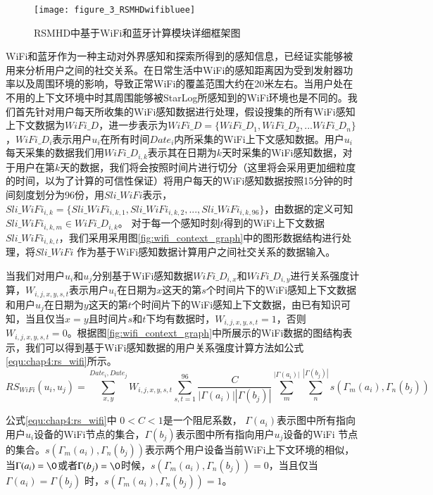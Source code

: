 \begin{figure}[htp]
\centering
\texttt{[image: figure\_3\_RSMHDwifibluee]}
\caption{RSMHD中基于WiFi和蓝牙计算模块详细框架图}
\label{fig:7_1_wifi}
\end{figure}
\par WiFi和蓝牙作为一种主动对外界感知和探索所得到的感知信息，已经证实能够被用来分析用户之间的社交关系。在日常生活中WiFi的感知距离因为受到发射器功率以及周围环境的影响，导致正常WiFi的覆盖范围大约在20米左右。当用户处在不用的上下文环境中时其周围能够被StarLog所感知到的WiFi环境也是不同的。我们首先针对用户每天所收集的WiFi感知数据进行处理，假设搜集的所有WiFi感知上下文数据为$WiFi\_D$，进一步表示为$WiFi\_D=\{  WiFi\_D_{1},WiFi\_D_{2},...WiFi\_D_{n}  \}$，$WiFi\_D_{i}$表示用户$u_{i}$在所有时间$Date_{i}$内所采集的WiFi上下文感知数据。用户$u_{i}$每天采集的数据我们用$WiFi\_D_{i,k}$表示其在日期为$k$天时采集的WiFi感知数据，对于用户在第$k$天的数据，我们将会按照时间片进行切分（这里将会采用更加细粒度的时间，以为了计算的可信性保证）将用户每天的WiFi感知数据按照15分钟的时间刻度划分为96份，用$Sli\_WiFi$表示，$Sli\_WiFi_{i,k}=\{Sli\_WiFi_{i,k,1},Sli\_WiFi_{i,k,2},...,Sli\_WiFi_{i,k,96}\}$，由数据的定义可知$Sli\_WiFi_{i,k,m} \in WiFi\_D_{i,k}$。 对于每一个感知时刻$t$得到的WiFi上下文数据$Sli\_WiFi_{i,k,t}$，我们采用采用图\ref{fig:wifi_context_graph}中的图形数据结构进行处理，将$Sli\_WiFi$ 作为基于WiFi感知数据计算用户之间社交关系的数据输入。

\par 当我们对用户$u_{i}$和$u_{j}$分别基于WiFi感知数据$WiFi\_D_{i,x}$和$WiFi\_D_{i,y}$进行关系强度计算，$W_{i,j,x,y,s,t}$表示用户$u_{i}$在日期为$x$这天的第$s$个时间片下的WiFi感知上下文数据和用户$u_{j}$在日期为$y$这天的第$t$个时间片下的WiFi感知上下文数据，由已有知识可知，当且仅当$x=y$且时间片$s$和$t$下均有数据时，$W_{i,j,x,y,s,t}=1$，否则$W_{i,j,x,y,s,t}=0$。根据图\ref{fig:wifi_context_graph}中所展示的WiFi数据的图结构表示，我们可以得到基于WiFi感知数据的用户关系强度计算方法如公式\ref{equ:chap4:rs_wifi}所示。
\begin{equation}
\label{equ:chap4:rs_wifi}
RS_{WiFi}(u_{i},u_{j})=\sum_{x ,y }^{ Date_{i}, Date_{j}}W_{i,j,x,y,s,t}\sum_{s,t=1}^{96} \frac{C}{ \left |\Gamma (a_{i})  \right |\left |\Gamma (b_{j})  \right | } \sum_{m}^{\left |\Gamma (a_{i})  \right |}  \sum_{n}^{\left |\Gamma (b_{j})  \right |}s(\Gamma_{m} (a_{i}),\Gamma_{n} (b_{j}))
\end{equation}
\par 公式\ref{equ:chap4:rs_wifi}中  $0< C<1$是一个阻尼系数， $\Gamma (a_{i}) $表示图中所有指向用户$u_{i}$设备的WiFi节点的集合，$\Gamma (b_{j}) $表示图中所有指向用户$u_{j}$设备的WiFi 节点的集合。$s(\Gamma_{m} (a_{i}),\Gamma_{n} (b_{j}))$表示两个用户设备当前WiFi上下文环境的相似，当$\Gamma (a_{i})= \O$或者$\Gamma (b_{j})=\O$时候，$s(\Gamma_{m} (a_{i}),\Gamma_{n} (b_{j}))=0$，当且仅当$\Gamma (a_{i})=\Gamma (b_{j})$ 时，$s(\Gamma_{m} (a_{i}),\Gamma_{n} (b_{j}))=1$。

